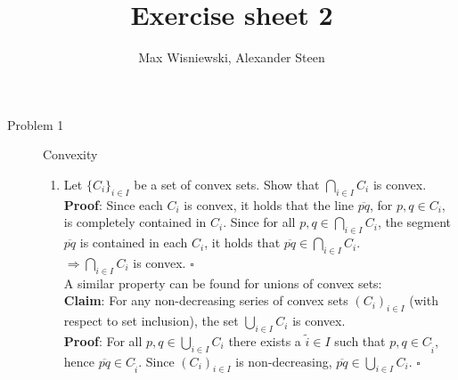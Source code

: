 \documentclass[11pt,a4paper,ngerman]{article}
\date{}
\title{Exercise sheet 2}
\author{Max Wisniewski, Alexander Steen}
\begin{document}

\renewcommand{\figurename}{Figure}

\maketitle
\thispagestyle{fancy}

\begin{description}
\item[Problem 1] Convexity
  \begin{enumerate}
    \item Let $\{C_i\}_{i \in I}$ be a set of convex sets. Show that $\bigcap_{i \in I} C_i$ is convex.\\

          \textbf{Proof}: Since each $C_i$ is convex, it holds that the line $\overline{pq}$,
                          for $p,q \in C_i$, is completely contained in $C_i$. 
                          Since for all $p,q \in \bigcap_{i \in I} C_i$, the segment 
                          $\overline{pq}$ is contained in each $C_i$, it holds that
                          $\overline{pq} \in \bigcap_{i \in I} C_i$.\\
                          $\Rightarrow \bigcap_{i \in I} C_i$ is convex.
                          \mbox{} \hfill $\square$ \\

          A similar property can be found for unions of convex sets: \\        
          \textbf{Claim}: For any non-decreasing series of
                          convex sets $(C_i)_{i \in I}$ (with respect to set inclusion),
                          the set $\bigcup_{i \in I} C_i$ is convex.\\
          \textbf{Proof}: For all $p,q \in \bigcup_{i \in I} C_i$ there exists a $\tilde{i} \in I$
                          such that $p,q \in C_{\tilde{i}}$, hence $\overline{pq} \in C_{\tilde{i}}$.
                          Since $(C_i)_{i \in I}$ is non-decreasing,
                          $\overline{pq} \in \bigcup_{i \in I} C_i$.
                          \mbox{} \hfill $\square$ 
                          

\end{enumerate}
\end{description}
\end{document}
